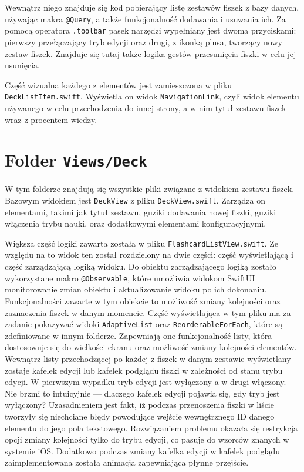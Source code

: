 \documentclass[final,a4paper,openany,12pt]{mwbk}
\begin{document}
Wewnątrz niego znajduje się kod pobierający listę zestawów fiszek z bazy danych, używając makra \texttt{@Query}, a także funkcjonalność dodawania i usuwania ich. Za pomocą operatora \texttt{.toolbar} pasek narzędzi wypełniany jest dwoma przyciskami: pierwszy przełączający tryb edycji oraz drugi, z ikonką plusa, tworzący nowy zestaw fiszek. Znajduje się tutaj także logika gestów przesunięcia fiszki w celu jej usunięcia. 

Część wizualna każdego z elementów jest zamieszczona w pliku \texttt{DeckListItem.swift}. Wyświetla on widok \texttt{NavigationLink}, czyli widok elementu używanego w celu przechodzenia do innej strony, a w nim tytuł zestawu fiszek wraz z procentem wiedzy. 

\section{Folder \texttt{Views/Deck}}

W tym folderze znajdują się wszystkie pliki związane z widokiem zestawu fiszek. Bazowym widokiem jest \texttt{DeckView} z pliku \texttt{DeckView.swift}. Zarządza on elementami, takimi jak tytuł zestawu, guziki dodawania nowej fiszki, guziki włączenia trybu nauki, oraz dodatkowymi elementami konfiguracyjnymi.

Większa część logiki zawarta została w pliku \texttt{FlashcardListView.swift}. Ze względu na to widok ten został rozdzielony na dwie części: część wyświetlającą i część zarządzającą logiką widoku. Do obiektu zarządzającego logiką zostało wykorzystane makro \texttt{@Observable}, które umożliwia widokom SwiftUI monitorowanie zmian obiektu i aktualizowanie widoku po ich dokonaniu. Funkcjonalności zawarte w tym obiekcie to możliwość zmiany kolejności oraz zaznaczenia fiszek w danym momencie. Część wyświetlająca w tym pliku ma za zadanie pokazywać widoki \texttt{AdaptiveList} oraz \texttt{ReorderableForEach}, które są zdefiniowane w innym folderze. Zapewniają one funkcjonalność listy, która dostosowuje się do wielkości ekranu oraz możliwość zmiany kolejności elementów. Wewnątrz listy przechodzącej po każdej z fiszek w danym zestawie wyświetlany zostaje kafelek edycji lub kafelek podglądu fiszki w zależności od stanu trybu edycji. W pierwszym wypadku tryb edycji jest wyłączony a w drugi włączony. Nie brzmi to intuicyjnie --- dlaczego kafelek edycji pojawia się, gdy tryb jest wyłączony? Uzasadnieniem jest fakt, iż podczas przenoszenia fiszki w liście tworzyły się niechciane błędy powodujące wejście wewnętrznego ID danego elementu do jego pola tekstowego. Rozwiązaniem problemu okazała się restrykcja opcji zmiany kolejności tylko do trybu edycji, co pasuje do wzorców znanych w systemie iOS. Dodatkowo podczas zmiany kafelka edycji w kafelek podglądu zaimplementowana została animacja zapewniająca płynne przejście.
\end{document}
